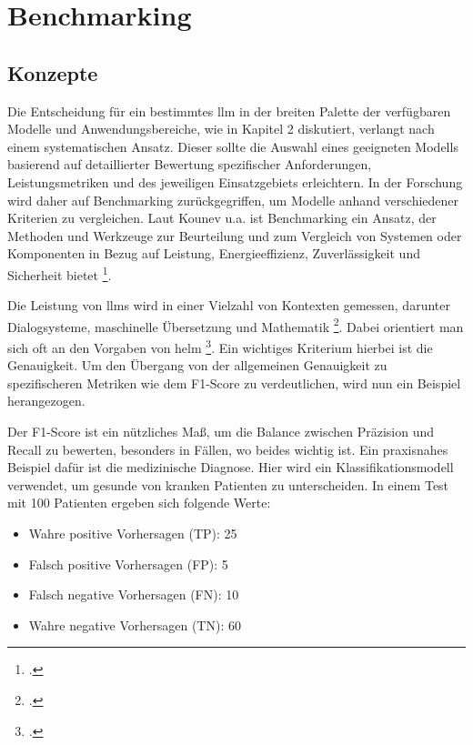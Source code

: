 \section{Benchmarking} \label{sec:benchmarking_konzepte}
\subsection{Konzepte} \label{sec:konzepte}
Die Entscheidung für ein bestimmtes \ac{llm} in der breiten Palette der verfügbaren Modelle und Anwendungsbereiche, wie in Kapitel 2 diskutiert, verlangt nach einem systematischen Ansatz. Dieser sollte die Auswahl eines geeigneten Modells basierend auf detaillierter Bewertung spezifischer Anforderungen, Leistungsmetriken und des jeweiligen Einsatzgebiets erleichtern. In der Forschung wird daher auf Benchmarking zurückgegriffen, um Modelle anhand verschiedener Kriterien zu vergleichen. Laut Kounev u.a. ist Benchmarking ein Ansatz, der Methoden und Werkzeuge zur Beurteilung und zum Vergleich von Systemen oder Komponenten in Bezug auf Leistung, Energieeffizienz, Zuverlässigkeit und Sicherheit bietet \footcite[Vgl.][S. 9]{kounev2020systems}.

Die Leistung von \acp{llm} wird in einer Vielzahl von Kontexten gemessen, darunter Dialogsysteme, maschinelle Übersetzung und Mathematik \footcites[Vgl.][S. 24]{naveed2023comprehensive} [Vgl.][S. 7 ff.]{chang2023survey}. Dabei orientiert man sich oft an den Vorgaben von \ac{helm} \footcite[Vgl.][S. 27 ff.]{liang2023holistic}. Ein wichtiges Kriterium hierbei ist die Genauigkeit. Um den Übergang von der allgemeinen Genauigkeit zu spezifischeren Metriken wie dem F1-Score zu verdeutlichen, wird nun ein Beispiel herangezogen.

Der F1-Score ist ein nützliches Maß, um die Balance zwischen Präzision und Recall zu bewerten, besonders in Fällen, wo beides wichtig ist. Ein praxisnahes Beispiel dafür ist die medizinische Diagnose. Hier wird ein Klassifikationsmodell verwendet, um gesunde von kranken Patienten zu unterscheiden. In einem Test mit 100 Patienten ergeben sich folgende Werte:

\begin{itemize}
    \item Wahre positive Vorhersagen (TP): 25
    \item Falsch positive Vorhersagen (FP): 5
    \item Falsch negative Vorhersagen (FN): 10
    \item Wahre negative Vorhersagen (TN): 60
\end{itemize}

